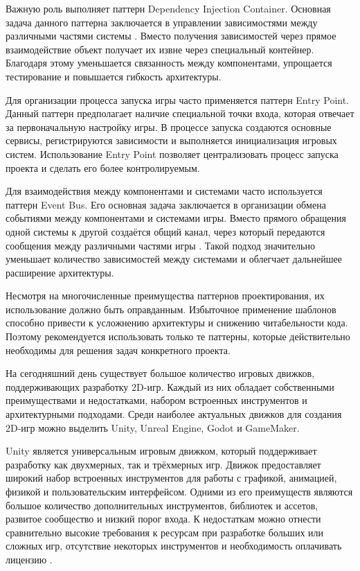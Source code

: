 \documentclass[a4paper,12pt]{report}
\begin{document}
Важную роль выполняет паттерн Dependency Injection Container. Основная задача данного паттерна заключается в управлении зависимостями между различными частями системы \cite{practicapi}. Вместо получения зависимостей через прямое взаимодействие объект получает их извне через специальный контейнер. Благодаря этому уменьшается связанность между компонентами, упрощается тестирование и повышается гибкость архитектуры.

Для организации процесса запуска игры часто применяется паттерн Entry Point. Данный паттерн предполагает наличие специальной точки входа, которая отвечает за первоначальную настройку игры. В процессе запуска создаются основные сервисы, регистрируются зависимости и выполняется инициализация игровых систем. Использование Entry Point позволяет централизовать процесс запуска проекта и сделать его более контролируемым.

Для взаимодействия между компонентами и системами часто используется паттерн Event Bus. Его основная задача заключается в организации обмена событиями между компонентами и системами игры. Вместо прямого обращения одной системы к другой создаётся общий канал, через который передаются сообщения между различными частями игры \cite{baron2021}. Такой подход значительно уменьшает количество зависимостей между системами и облегчает дальнейшее расширение архитектуры.

Несмотря на многочисленные преимущества паттернов проектирования, их использование должно быть оправданным. Избыточное применение шаблонов способно привести к усложнению архитектуры и снижению читабельности кода. Поэтому рекомендуется использовать только те паттерны, которые действительно необходимы для решения задач конкретного проекта.

На сегодняшний день существует большое количество игровых движков, поддерживающих разработку 2D-игр. Каждый из них обладает собственными преимуществами и недостатками, набором встроенных инструментов и архитектурными подходами. Среди наиболее актуальных движков для создания 2D-игр можно выделить Unity, Unreal Engine, Godot и GameMaker.

Unity является универсальным игровым движком, который поддерживает разработку как двухмерных, так и трёхмерных игр. Движок предоставляет широкий набор встроенных инструментов для работы с графикой, анимацией, физикой и пользовательским интерфейсом. Одними из его преимуществ являются большое количество дополнительных инструментов, библиотек и ассетов, развитое сообщество и низкий порог входа. К недостаткам можно отнести сравнительно высокие требования к ресурсам при разработке больших или сложных игр, отсутствие некоторых инструментов и необходимость оплачивать лицензию \cite{uzayr2022}.
\end{document}
